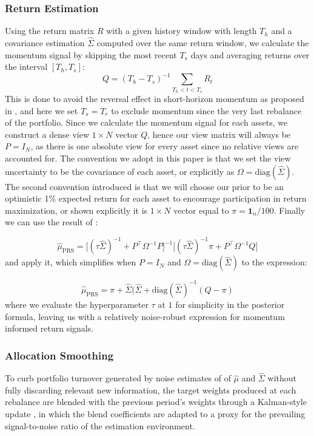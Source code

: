 \documentclass[12pt]{article}
\begin{document}
\subsubsection{Return Estimation}

Using the return matrix $R$ with a given history window with length $T_h$ and a covariance estimation $\hat{\Sigma}$ computed over the same return window, we calculate the momentum signal by skipping the most recent $T_s$ days and averaging returns over the interval $[T_h, T_s]$: 
\begin{equation}
    Q =  (T_h - T_s)^{-1}\sum_{T_h < t < T_s} R_{t}
    \label{eq:view_const}
\end{equation}
This is done to avoid the reversal effect in short-horizon momentum as proposed in \cite{jegadeesh1993}, and here we set $T_s=T_r$ to exclude momentum since the very last rebalance of the portfolio. Since we calculate the momentum signal for each assets, we construct a dense view $1 \times N$ vector $Q$, hence our view matrix will always be $P=I_N$, as there is one absolute view for every asset since no relative views are accounted for. The convention we adopt in this paper is that we set the view uncertainty to be the covariance of each asset, or explicitly as $\Omega = \text{diag}(\hat{\Sigma})$. The second convention introduced is that we will choose our prior to be an optimistic 1\% expected return for each asset to encourage participation in return maximization, or shown explicitly it is $1 \times N$ vector equal to $\pi=\mathbf{1}_n / 100$. Finally we can use the result of \cite{blacklitterman1992}:

\begin{equation}
    \hat{\mu}_{\text{PRS}} = \bigl[(\tau\hat{\Sigma})^{-1} + P^{\top}\Omega^{-1}P\bigr]^{-1}
                   \bigl[(\tau\hat{\Sigma})^{-1}\pi + P^{\top}\Omega^{-1}Q\bigr]
    \label{eq:BL_formula}
\end{equation}
and apply it, which simplifies when $P=I_N$ and $\Omega = \text{diag}(\hat{\Sigma})$ to the expression:

\begin{equation}
\hat{\mu}_{\text{PRS}} = \pi + \hat{\Sigma} (\hat{\Sigma}+\text{diag}(\hat{\Sigma})^{-1}(Q-\pi)
    \label{eq:BL_simplified}
\end{equation}
where we evaluate the hyperparameter $\tau$ at $1$ for simplicity in the posterior formula, leaving us with a relatively noise-robust expression for momentum informed return signals.

\subsubsection{Allocation Smoothing}
To curb portfolio turnover generated by noise estimates of of $\hat{\mu}$ and $\hat{\Sigma}$ without fully discarding relevant new information, the target weights produced at each rebalance are blended with the previous period's weights through a Kalman-style update \cite{kalman1960}, in which the blend coefficients are adapted to a proxy for the prevailing signal-to-noise ratio of the estimation environment.
\end{document}
